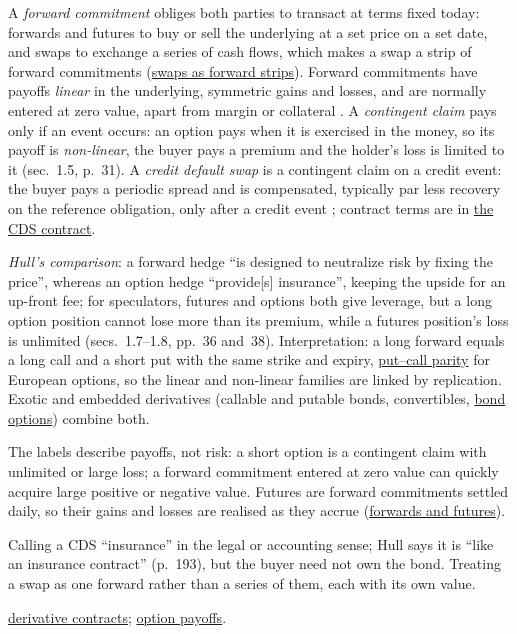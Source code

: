 \begin{qfdefinition}\label{def:derivative-types-commitments-contingent}
 A \emph{forward commitment} obliges both parties to transact at terms fixed today: forwards and futures to buy or sell the underlying at a set price on a set date, and swaps to exchange a series of cash flows, which makes a swap a strip of forward commitments (\hyperref[def:swaps-as-forward-strips]{swaps as forward strips}). Forward commitments have payoffs \emph{linear} in the underlying, symmetric gains and losses, and are normally entered at zero value, apart from margin or collateral \citep[chap.~1, secs.~1.3--1.5, pp.~28--31, and chap.~7, sec.~7.1, p.~172]{s7-hulloptions}. A \emph{contingent claim} pays only if an event occurs: an option pays when it is exercised in the money, so its payoff is \emph{non-linear}, the buyer pays a premium and the holder's loss is limited to it (sec.~1.5, p.~31). A \emph{credit default swap} is a contingent claim on a credit event: the buyer pays a periodic spread and is compensated, typically par less recovery on the reference obligation, only after a credit event \citep[chap.~7, sec.~7.12, pp.~193--194]{s7-hulloptions}; contract terms are in \hyperref[mech:cds-contract-credit-events]{the CDS contract}.

 \emph{Hull's comparison}: a forward hedge ``is designed to neutralize risk by fixing the price'', whereas an option hedge ``provide[s] insurance'', keeping the upside for an up-front fee; for speculators, futures and options both give leverage, but a long option position cannot lose more than its premium, while a futures position's loss is unlimited (secs.~1.7--1.8, pp.~36 and~38). Interpretation: a long forward equals a long call and a short put with the same strike and expiry, \hyperref[res:synthetic-short-put-call]{put--call parity} for European options, so the linear and non-linear families are linked by replication. Exotic and embedded derivatives (callable and putable bonds, convertibles, \hyperref[def:bond-cash-flow-contingencies]{bond options}) combine both.

 The labels describe payoffs, not risk: a short option is a contingent claim with unlimited or large loss; a forward commitment entered at zero value can quickly acquire large positive or negative value. Futures are forward commitments settled daily, so their gains and losses are realised as they accrue (\hyperref[res:forward-futures-price-difference]{forwards and futures}).

 Calling a CDS ``insurance'' in the legal or accounting sense; Hull says it is ``like an insurance contract'' (p.~193), but the buyer need not own the bond. Treating a swap as one forward rather than a series of them, each with its own value.

 \hyperref[def:derivative-contracts]{derivative contracts}; \hyperref[meth:option-payoff-profit]{option payoffs}.

\end{qfdefinition}

